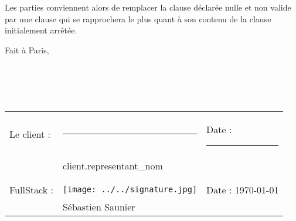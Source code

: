 \documentclass[11pt]{article}
\begin{document}
Les parties conviennent alors de remplacer la clause déclarée nulle et non valide par une clause qui se rapprochera le plus quant à son contenu de la clause initialement arrêtée.

\vspace{2cm}

\noindent Fait à Paris,\\\\\\\\\\

\noindent \begin{tabular}{l l l}
Le client : & \rule{6cm}{.2pt} & Date : \rule{2.4cm}{.2pt}\\
                         & {{ client.representant_nom }}      & \\\\\\
FullStack :          & \texttt{[image: ../../signature.jpg]} & Date : \today \\
                         & Sébastien Saunier      & \\
\end{tabular}
\end{document}

